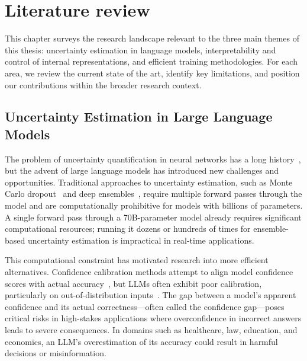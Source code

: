 \chapter{Literature review}

This chapter surveys the research landscape relevant to the three main themes of this thesis: uncertainty estimation in language models, interpretability and control of internal representations, and efficient training methodologies. For each area, we review the current state of the art, identify key limitations, and position our contributions within the broader research context.

\section{Uncertainty Estimation in Large Language Models}

The problem of uncertainty quantification in neural networks has a long history~\cite{gal2016dropout}, but the advent of large language models has introduced new challenges and opportunities. Traditional approaches to uncertainty estimation, such as Monte Carlo dropout~\cite{gal2016dropout} and deep ensembles~\cite{lakshminarayanan2017simple}, require multiple forward passes through the model and are computationally prohibitive for models with billions of parameters. A single forward pass through a 70B-parameter model already requires significant computational resources; running it dozens or hundreds of times for ensemble-based uncertainty estimation is impractical in real-time applications.

This computational constraint has motivated research into more efficient alternatives. Confidence calibration methods attempt to align model confidence scores with actual accuracy~\cite{guo2017calibration}, but LLMs often exhibit poor calibration, particularly on out-of-distribution inputs~\cite{jiang2021can}. The gap between a model's apparent confidence and its actual correctness---often called the confidence gap---poses critical risks in high-stakes applications where overconfidence in incorrect answers leads to severe consequences. In domains such as healthcare, law, education, and economics, an LLM's overestimation of its accuracy could result in harmful decisions or misinformation.

